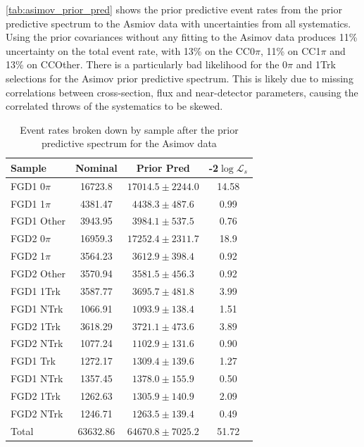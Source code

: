 \autoref{tab:asimov_prior_pred} shows the prior predictive event rates from the prior predictive spectrum to the Asmiov data with uncertainties from all systematics. Using the prior covariances without any fitting to the Asimov data produces 11\% uncertainty on the total event rate, with 13\% on the CC0$\pi$, 11\% on CC1$\pi$ and 13\% on CCOther. There is a particularly bad likelihood for the 0$\pi$ and 1Trk selections for the Asimov prior predictive spectrum. This is likely due to missing correlations between cross-section, flux and near-detector parameters, causing the correlated throws of the systematics to be skewed.
\begin{table}[h]
	\centering
	\begin{tabular}{l | c c | c}
		\hline
		\hline
		Sample & Nominal & Prior Pred & -2$\log\mathcal{L}_s$ \\ 
		\hline
		FGD1 0$\pi$ & 16723.8 &  $17014.5\pm2244.0$ &  14.58 \\
		FGD1 1$\pi$ & 4381.47 &  $4438.3\pm487.6$ &  0.99 \\
		FGD1 Other & 3943.95 &  $3984.1\pm537.5$  & 0.76\\
		
		FGD2 0$\pi$ & 16959.3 &  $17252.4\pm2311.7$ &  18.9 \\
		FGD2 1$\pi$ & 3564.23 &  $3612.9\pm398.4$ &  0.92 \\
		FGD2 Other & 3570.94 &  $3581.5\pm456.3$ &  0.92 \\
		\hline
		FGD1 1Trk & 3587.77 &  $3695.7\pm481.8$ &  3.99 \\
		FGD1 NTrk & 1066.91 &  $1093.9\pm138.4$ &  1.51  \\
		FGD2 1Trk & 3618.29 &  $3721.1\pm473.6$ &  3.89 \\
		FGD2 NTrk & 1077.24 &  $1102.9\pm131.6$ &  0.90 \\
		\hline
		FGD1 \numu 1 Trk & 1272.17 &  $1309.4\pm139.6$ &  1.27 \\
		FGD1 \numu NTrk & 1357.45 &  $1378.0\pm155.9$ &  0.50 \\
		FGD2 \numu 1Trk & 1262.63 &  $1305.9\pm140.9$ &  2.09 \\
		FGD2 \numu NTrk & 1246.71 &  $1263.5\pm139.4$ &  0.49 \\
		\hline
		Total & 63632.86 & $64670.8\pm7025.2$ & 51.72 \\
		\hline
		\hline
	\end{tabular}
	\caption{Event rates broken down by sample after the prior predictive spectrum for the Asimov data}
	\label{tab:asimov_prior_pred}
\end{table}

